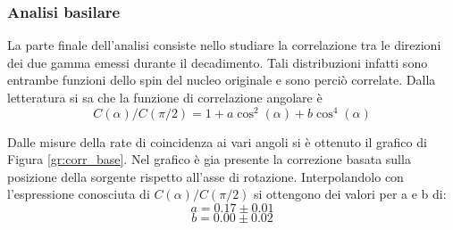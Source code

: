 \subsubsection{Analisi basilare}

La parte finale dell'analisi consiste nello studiare la correlazione tra le direzioni dei due gamma emessi durante il decadimento. Tali distribuzioni infatti sono entrambe funzioni dello spin del nucleo originale e sono perciò correlate. Dalla letteratura si sa che la funzione di correlazione angolare è 
$$ C(\alpha)/C(\pi/2) = 1+a\cos^2(\alpha)+b\cos^4(\alpha)$$

Dalle misure della rate di coincidenza ai vari angoli si è ottenuto il grafico di Figura \ref{gr:corr_base}. Nel grafico è gia presente la correzione basata sulla posizione della sorgente rispetto all'asse di rotazione. Interpolandolo con l'espressione conosciuta di $C(\alpha)/C(\pi/2)$ si ottengono dei valori per a e b di:
$$a=0.17\pm 0.01$$
$$b=0.00\pm 0.02$$


